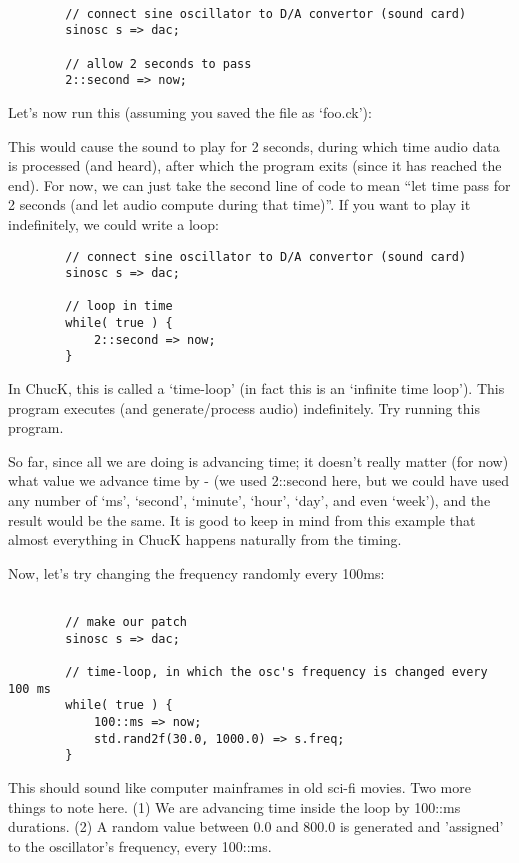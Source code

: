 \begin{verbatim}

        // connect sine oscillator to D/A convertor (sound card)
        sinosc s => dac;

        // allow 2 seconds to pass
        2::second => now;
\end{verbatim}

Let's now run this (assuming you saved the file as `foo.ck'):


This would cause the sound to play for 2 seconds, during which time audio data is processed (and heard), after which the program exits (since it has reached the end). For now, we can just take the second line of code to mean ``let time pass for 2 seconds (and let audio compute during that time)''. If you want to play it indefinitely, we could write a loop:

\begin{verbatim}
        // connect sine oscillator to D/A convertor (sound card)
        sinosc s => dac;

        // loop in time
        while( true ) {
            2::second => now;
        }
\end{verbatim}

In ChucK, this is called a `time-loop' (in fact this is an `infinite time loop'). This program executes (and generate/process audio) indefinitely. Try running this program. 

So far, since all we are doing is advancing time; it doesn't really matter (for now) what value we advance time by - (we used 2::second here, but we could have used any number of `ms', `second', `minute', `hour', `day', and even `week'), and the result would be the same. It is good to keep in mind from this example that almost everything in ChucK happens naturally from the timing. 

Now, let's try changing the frequency randomly every 100ms:
\begin{verbatim}

        // make our patch
        sinosc s => dac;

        // time-loop, in which the osc's frequency is changed every 100 ms
        while( true ) {
            100::ms => now;
            std.rand2f(30.0, 1000.0) => s.freq;
        }
\end{verbatim}

This should sound like computer mainframes in old sci-fi movies. Two more things to note here. (1) We are advancing time inside the loop by 100::ms durations. (2) A random value between 0.0 and 800.0 is generated and 'assigned' to the oscillator's frequency, every 100::ms. 

